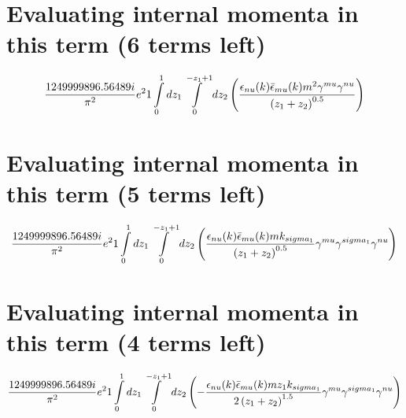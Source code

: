 \section*{Evaluating internal momenta in this term (6 terms left)}
\begin{dmath}\frac{1249999896.56489 i}{\pi^{2}} e^{2}1\int\limits_{ 0 }^{ 1 } d{ z_{ 1 } }\int\limits_{ 0 }^{ - { z_{ 1 } } + 1 } d{ z_{ 2 } }\left(\frac{\epsilon_{ \\nu }({ k }) \bar{\epsilon}_{ \\mu }({ k }) m^{2} { \gamma^{ \\mu } } { \gamma^{ \\nu } }}{\left({ z_{ 1 } } + { z_{ 2 } }\right)^{0.5}}\right)\end{dmath}
\section*{Evaluating internal momenta in this term (5 terms left)}
\begin{dmath}\frac{1249999896.56489 i}{\pi^{2}} e^{2}1\int\limits_{ 0 }^{ 1 } d{ z_{ 1 } }\int\limits_{ 0 }^{ - { z_{ 1 } } + 1 } d{ z_{ 2 } }\left(\frac{\epsilon_{ \\nu }({ k }) \bar{\epsilon}_{ \\mu }({ k }) m { { k }_{ \\sigma_1 } }}{\left({ z_{ 1 } } + { z_{ 2 } }\right)^{0.5}} { \gamma^{ \\mu } } { \gamma^{ \\sigma_1 } } { \gamma^{ \\nu } }\right)\end{dmath}
\section*{Evaluating internal momenta in this term (4 terms left)}
\begin{dmath}\frac{1249999896.56489 i}{\pi^{2}} e^{2}1\int\limits_{ 0 }^{ 1 } d{ z_{ 1 } }\int\limits_{ 0 }^{ - { z_{ 1 } } + 1 } d{ z_{ 2 } }\left(- \frac{\epsilon_{ \\nu }({ k }) \bar{\epsilon}_{ \\mu }({ k }) m { z_{ 1 } } { { k }_{ \\sigma_1 } }}{2 \left({ z_{ 1 } } + { z_{ 2 } }\right)^{1.5}} { \gamma^{ \\mu } } { \gamma^{ \\sigma_1 } } { \gamma^{ \\nu } }\right)\end{dmath}
